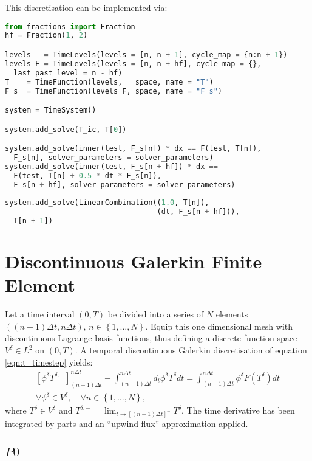 \documentclass[a4paper]{book}
\begin{document}
This discretisation can be implemented via:
\begin{lstlisting}[language = python, frame = single, basicstyle=\footnotesize]
from fractions import Fraction
hf = Fraction(1, 2)

levels   = TimeLevels(levels = [n, n + 1], cycle_map = {n:n + 1})
levels_F = TimeLevels(levels = [n, n + hf], cycle_map = {},
  last_past_level = n - hf)
T    = TimeFunction(levels,   space, name = "T")
F_s  = TimeFunction(levels_F, space, name = "F_s")

system = TimeSystem()

system.add_solve(T_ic, T[0])

system.add_solve(inner(test, F_s[n]) * dx == F(test, T[n]),
  F_s[n], solver_parameters = solver_parameters)
system.add_solve(inner(test, F_s[n + hf]) * dx ==
  F(test, T[n] + 0.5 * dt * F_s[n]),
  F_s[n + hf], solver_parameters = solver_parameters)
  
system.add_solve(LinearCombination((1.0, T[n]),
                                   (dt, F_s[n + hf])),
  T[n + 1])
\end{lstlisting}

\section{Discontinuous Galerkin Finite Element}

Let a time interval $(0, T)$ be divided into a series of $N$ elements
$( (n - 1) \Delta t, n \Delta t )$,
$n \in \left\{ 1, \ldots, N \right\}$. Equip this one dimensional mesh with
discontinuous Lagrange basis functions, thus defining a discrete function
space $V^\delta \in L^2$ on $(0, T)$. A temporal discontinuous Galerkin
discretisation of equation \eqref{eqn:t_timestep} yields:
\begin{align}\label{eqn:t_timestep_dg}
  \left[ \phi^\delta T^{\delta,-} \right]_{(n - 1) \Delta t}^{n \Delta t}
    - \int_{(n - 1) \Delta t}^{n \Delta t} d_t \phi^\delta T^\delta dt
    = \int_{(n - 1) \Delta t}^{n \Delta t} \phi^\delta F \left( T^\delta \right) dt \nonumber \\
    \forall \phi^\delta \in V^\delta, \quad \forall n \in \left\{ 1, \ldots, N \right\},
\end{align}
where $T^\delta \in V^\delta$ and
$T^{\delta,-} = \lim_{t \rightarrow \left[ (n - 1) \Delta t \right]^{-}} T^{\delta}$.
The time derivative has been integrated by parts and an ``upwind flux''
approximation applied.

\subsection{$P0$}
\end{document}
